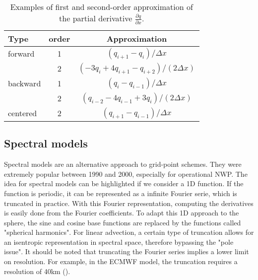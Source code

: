 \begin{table}
  \centering
  \caption{Examples of first and second-order approximation of the partial
    derivative $\frac{\partial q}{\partial x}$.}
  \label{tab:derivatives}
  \begin{tabular}{lcc}
    \toprule
    Type & order & Approximation\\
    \midrule 
    forward & 1 & $(q_{i+1}-q_i)/\Delta x$\\
    & 2 & $(-3q_i + 4q_{i+1}-q_{i+2})/(2\Delta x)$\\
    \midrule 
    backward & 1 & $(q_{i}-q_{i-1})/\Delta x$\\
    & 2 & $(q_{i-2} - 4q_{i-1} + 3q_{i})/(2\Delta x)$\\
    \midrule 
    centered & 2 & $(q_{i+1}-q_{i-1})/\Delta x$\\
   \bottomrule
  \end{tabular}
\end{table}

\subsection{Spectral models}
Spectral models are an alternative approach to grid-point schemes.
They were extremely popular between 1990 and 2000,
especially for operational \gls{NWP}. The idea for spectral models can be
highlighted if we consider a 1D function. If the function is periodic, it can be
represented as a infinite Fourier serie, which is truncated in practice. With this
Fourier representation, computing the derivatives is easily done
from the Fourier coefficients. To adapt this 1D approach to the sphere, the sine
and cosine base functions are replaced by the functions called "spherical
harmonics". For linear advection, a certain type of truncation allows for an
isentropic representation in spectral space, therefore bypassing the "pole
issue". It should be noted that truncating the Fourier series implies a lower
limit on resolution. For example, in the \gls{ECMWF} model, the truncation
requires a resolution of 40km (\cite{ECMWF2001}). 


